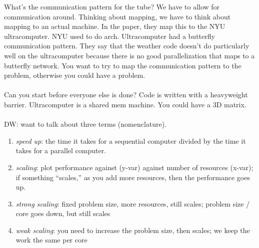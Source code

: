 What's the communication pattern for the tube?
We have to allow for communication around.
Thinking about mapping, we have to think about mapping to an actual machine.
In the paper, they map this to the NYU ultracomputer.
NYU used to do arch.
Ultracomputer had a butterfly communication pattern.
They say that the weather code doesn't do particularly well on the ultracomputer because there is no good parallelization that maps to a butterfly network.
You want to try to map the communication pattern to the problem, otherwise you could have a problem.
\\ \\
Can you start before everyone else is done?
Code is written with a heavyweight barrier.
Ultracomputer is a shared mem machine.
You could have a 3D matrix.
\\ \\
DW: want to talk about three terms (nomenclature).
\begin{enumerate}
    \item \textit{speed up}: the time it takes for a sequential computer divided by the time it takes for a parallel computer.
    \item \textit{scaling}: plot performance against (y-var) against number of resources (x-var); if something ``scales,'' as you add more resources, then the performance goes up.
    \item \textit{strong scaling}: fixed problem size, more resources, still scales; problem size / core goes down, but still scales
    \item \textit{weak scaling}: you need to increase the problem size, then scales; we keep the work the same per core
\end{enumerate}




